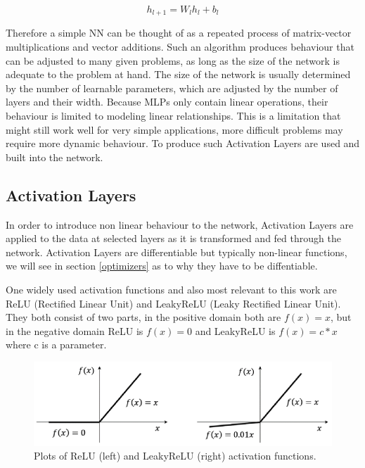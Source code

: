 \documentclass[a4paper,10pt]{scrartcl}
\begin{document}
\begin{equation}
    h_{l+1} = W_lh_l + b_l
\end{equation}

Therefore a simple NN can be thought of as a repeated process of matrix-vector multiplications and vector additions.
Such an algorithm produces behaviour that can be adjusted to many given problems, as long as the size of the network is adequate to the problem at hand.
The size of the network is usually determined by the number of learnable parameters, which are adjusted by the number of layers and their width.
Because MLPs only contain linear operations, their behaviour is limited to modeling linear relationships.
This is a limitation that might still work well for very simple applications, more difficult problems may require more dynamic behaviour.
To produce such Activation Layers are used and built into the network.

\subsection{Activation Layers}

In order to introduce non linear behaviour to the network, Activation Layers are applied to the data at selected layers as it is transformed and fed through the network.
Activation Layers are differentiable but typically non-linear functions, we will see in section \ref{optimizers} as to why they have to be diffentiable.

One widely used activation functions and also most relevant to this work are ReLU (Rectified Linear Unit) and LeakyReLU (Leaky Rectified Linear Unit).
They both consist of two parts, in the positive domain both are $f(x) = x$, but in the negative domain ReLU is $f(x) = 0$ and LeakyReLU is $f(x) = c * x$ where c is a parameter.

\begin{figure}[h]
    \includegraphics[scale=1]{images/relu.png}
    \centering
    \caption{Plots of ReLU (left) and LeakyReLU (right) activation functions.}
    \label{fig:activationfunctions}
\end{figure}
\end{document}
